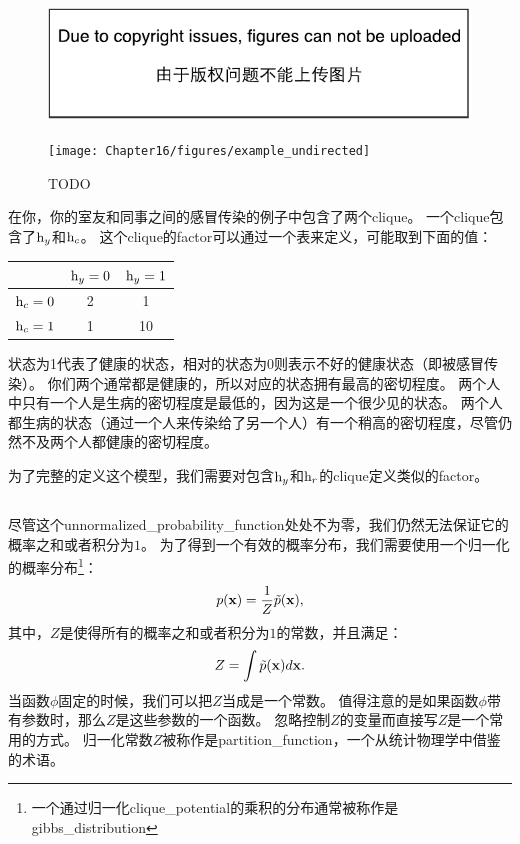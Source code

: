 \begin{figure}[!htb]
\ifOpenSource
\centerline{\includegraphics{figure.pdf}}
\else
	\centerline{\texttt{[image: Chapter16/figures/example\_undirected]}}
\fi
	\caption{TODO}
	\label{fig:example_undirected}
\end{figure}



在你，你的室友和同事之间的感冒传染的例子中包含了两个\gls{clique}。
一个\gls{clique}包含了$\mathrm{h}_y$和$\mathrm{h}_c$。
这个\gls{clique}的\gls{factor}可以通过一个表来定义，可能取到下面的值：

\begin{tabular}{c|cc}
		& $\mathrm{h}_y = 0$ & $\mathrm{h}_y = 1$ \\ \hline
		$\mathrm{h}_c = 0$ & 2 & 1 \\
		$\mathrm{h}_c = 1$  & 1 & 10 \\
\end{tabular}


状态为1代表了健康的状态，相对的状态为0则表示不好的健康状态（即被感冒传染）。
你们两个通常都是健康的，所以对应的状态拥有最高的密切程度。
两个人中只有一个人是生病的密切程度是最低的，因为这是一个很少见的状态。
两个人都生病的状态（通过一个人来传染给了另一个人）有一个稍高的密切程度，尽管仍然不及两个人都健康的密切程度。


为了完整的定义这个模型，我们需要对包含$\mathrm{h}_y$和$\mathrm{h}_r$的\gls{clique}定义类似的\gls{factor}。


\subsection{}
\label{sec:the_partition_function}



尽管这个\gls{unnormalized_probability_function}处处不为零，我们仍然无法保证它的概率之和或者积分为$1$。
为了得到一个有效的概率分布，我们需要使用一个归一化的概率分布\footnote{一个通过归一化\gls{clique_potential}的乘积的分布通常被称作是\gls{gibbs_distribution}}：
\begin{align}
p(\mathbf{x}) = \frac{1}{Z}\tilde{p}(\mathbf{x}),
\end{align}
其中，$Z$是使得所有的概率之和或者积分为$1$的常数，并且满足：
\begin{align}
Z = \int \tilde{p}(\mathbf{x})d\mathbf{x}.
\end{align}
当函数$\phi$固定的时候，我们可以把$Z$当成是一个常数。
值得注意的是如果函数$\phi$带有参数时，那么$Z$是这些参数的一个函数。
忽略控制$Z$的变量而直接写$Z$是一个常用的方式。
归一化常数$Z$被称作是\gls{partition_function}，一个从统计物理学中借鉴的术语。


